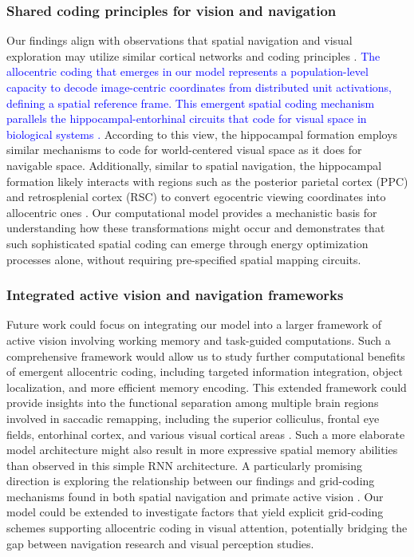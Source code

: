 \documentclass[10pt,letterpaper]{article}
\begin{document}
\subsubsection{Shared coding principles for vision and navigation}
Our findings align with observations that spatial navigation and visual exploration may utilize similar cortical networks and coding principles \citep{nau_how_2018}. \textcolor{blue}{The allocentric coding that emerges in our model represents a population-level capacity to decode image-centric coordinates from distributed unit activations, defining a spatial reference frame. This emergent spatial coding mechanism parallels the hippocampal-entorhinal circuits that code for visual space in biological systems \citep{nau_how_2018, killian_map_2012}.} According to this view, the hippocampal formation employs similar mechanisms to code for world-centered visual space as it does for navigable space. Additionally, similar to spatial navigation, the hippocampal formation likely interacts with regions such as the posterior parietal cortex (PPC) and retrosplenial cortex (RSC) to convert egocentric viewing coordinates into allocentric ones \citep{byrne_remembering_2007,clark_retrosplenial-parietal_2018}. Our computational model provides a mechanistic basis for understanding how these transformations might occur and demonstrates that such sophisticated spatial coding can emerge through energy optimization processes alone, without requiring pre-specified spatial mapping circuits.

\subsubsection{Integrated active vision and navigation frameworks}
Future work could focus on integrating our model into a larger framework of active vision involving working memory and task-guided computations. Such a comprehensive framework would allow us to study further computational benefits of emergent allocentric coding, including targeted information integration, object localization, and more efficient memory encoding. This extended framework could provide insights into the functional separation among multiple brain regions involved in saccadic remapping, including the superior colliculus, frontal eye fields, entorhinal cortex, and various visual cortical areas \citep{duhamel_updating_1992, graziano_cortical_2002, leigh_neurology_2015, sommer_influence_2006, sparks_brainstem_2002, wurtz_role_1986, nau_how_2018}. Such a more elaborate model architecture might also result in more expressive spatial memory abilities than observed in this simple RNN architecture. A particularly promising direction is exploring the relationship between our findings and grid-coding mechanisms found in both spatial navigation \citep{doeller_evidence_2010, hafting_microstructure_2005, sargolini_conjunctive_2006} and primate active vision \citep{killian_map_2012, nau_how_2018}. Our model could be extended to investigate factors that yield explicit grid-coding schemes supporting allocentric coding in visual attention, potentially bridging the gap between navigation research and visual perception studies.
\end{document}
